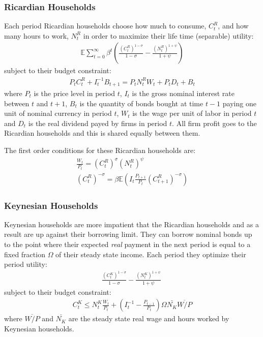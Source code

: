 \documentclass[titlepage]{\econtex}\newcommand{\texname}{ConsumptionHeterogeneity}
\begin{document}
\subsubsection{Ricardian Households}
Each period Ricardian households choose how much to consume, $C^R_t$, and how many hours to work, $N^R_t$ in order to maximize their life time (separable) utility:
\begin{align*}
\mathbb{E}\sum_{t=0}^{\infty}\beta^t \left(\frac{\left(C^R_t\right)^{1-\sigma}}{1-\sigma} - \frac{\left(N^R_t\right)^{1+\psi}}{1+\psi}\right)
\end{align*}
subject to their budget constraint:
\begin{align*}
P_t C^R_t + I_{t}^{-1}B_{t+1} = P_t N^R_t W_t + P_t D_t + B_t
\end{align*}
where $P_t$ is the price level in period $t$, $I_t$ is the gross nominal interest rate between $t$ and $t+1$, $B_t$ is the quantity of bonds bought at time $t-1$ paying one unit of nominal currency in period $t$, $W_t$ is the wage per unit of labor in period $t$ and $D_t$ is the real dividend payed by firms in period $t$. All firm profit goes to the Ricardian households and this is shared equally between them.

The first order conditions for these Ricardian households are:
\begin{align}
\frac{W_t}{P_t} = \left(C^R_t\right)^{\sigma}\left(N^R_t\right)^{\psi} \label{foc_hours_R} \\
\left(C^R_t\right)^{-\sigma} = \beta \mathbb{E}\left(I_t\frac{P_{t+1}}{P_t} \left(C^R_{t+1}\right)^{-\sigma}\right)	\label{euler_R}
\end{align}

\subsubsection{Keynesian Households}
Keynesian households are more impatient that the Ricardian households and as a result are up against their borrowing limit. They can borrow nominal bonds up to the point where their expected \textit{real} payment in the next period is equal to a fixed fraction $\Omega$ of their steady state income. Each period they optimize their period utility:
\begin{align*}
\frac{\left(C^K_t\right)^{1-\sigma}}{1-\sigma} - \frac{\left(N^K_t\right)^{1+\psi}}{1+\psi}\
\end{align*}
subject to their budget constraint:
\begin{align}
C^K_t \leq N^K_t \frac{W_t}{P_t} + \left(I_{t}^{-1} - \frac{P_{t-1}}{P_t}\right)\Omega \bar{N_K}\overline{W/P}  \label{budget_constraint_K}
\end{align}
where $\overline{W/P}$ and $\bar{N_K}$ are the steady state real wage and hours worked by Keynesian households.
\end{document}
